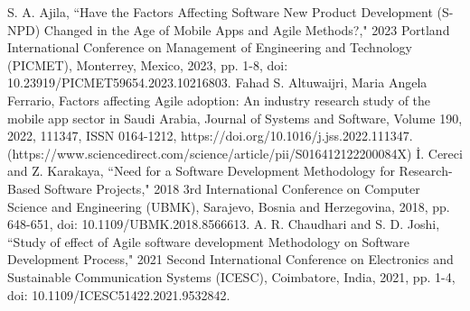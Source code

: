 \documentclass[conference]{IEEEtran}
\begin{document}
\begin{thebibliography}{00}
     S. A. Ajila, ``Have the Factors Affecting Software New Product Development (S-NPD) Changed in the Age of Mobile Apps and Agile Methods?," 2023 Portland International Conference on Management of Engineering and Technology (PICMET), Monterrey, Mexico, 2023, pp. 1-8, doi: 10.23919/PICMET59654.2023.10216803.
     Fahad S. Altuwaijri, Maria Angela Ferrario, Factors affecting Agile adoption: An industry research study of the mobile app sector in Saudi Arabia,
    Journal of Systems and Software,
    Volume 190, 2022, 111347, ISSN 0164-1212, https://doi.org/10.1016/j.jss.2022.111347. (https://www.sciencedirect.com/science/article/pii/S016412122200084X)
     İ. Cereci and Z. Karakaya, ``Need for a Software Development Methodology for Research-Based Software Projects," 2018 3rd International Conference on Computer Science and Engineering (UBMK), Sarajevo, Bosnia and Herzegovina, 2018, pp. 648-651, doi: 10.1109/UBMK.2018.8566613.
     A. R. Chaudhari and S. D. Joshi, ``Study of effect of Agile software development Methodology on Software Development Process," 2021 Second International Conference on Electronics and Sustainable Communication Systems (ICESC), Coimbatore, India, 2021, pp. 1-4, doi: 10.1109/ICESC51422.2021.9532842.
    \end{thebibliography}
\end{document}
